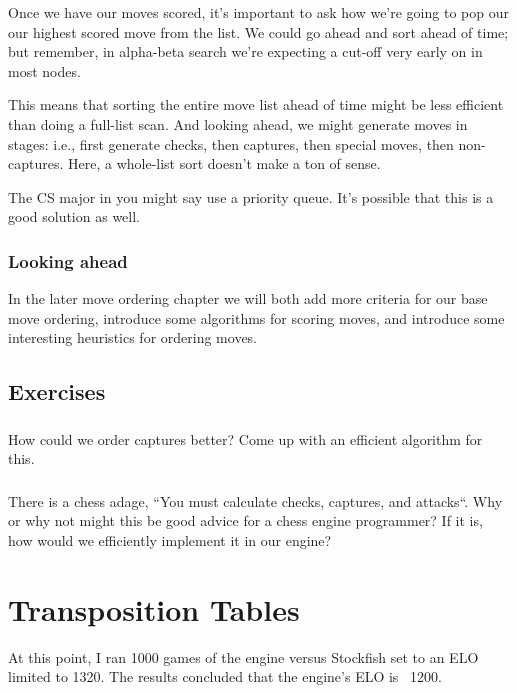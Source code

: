 \documentclass[letterpaper,11pt]{article}
\begin{document}
Once we have our moves scored, it's important to ask how we're going to pop our
our highest scored move from the list. We could go ahead and sort ahead of time;
but remember, in alpha-beta search we're expecting a cut-off very early on in most nodes.

This means that sorting the entire move list ahead of time might be less efficient than 
doing a full-list scan. And looking ahead, we might generate moves in stages: i.e.,
first generate checks, then captures, then special moves, then non-captures. Here, a whole-list 
sort doesn't make a ton of sense.

The CS major in you might say use a priority queue. It's possible that this is a good
solution as well.

\subsubsection*{Looking ahead}

In the later move ordering chapter we will both add more criteria for our base move ordering, 
introduce some algorithms for scoring moves, and introduce some interesting heuristics for 
ordering moves.

\subsection{Exercises}

\subsubsection{}

How could we order captures better? Come up with an efficient algorithm for this.

\subsubsection{}

There is a chess adage, ``You must calculate checks, captures, and attacks``. 
Why or why not might this be good advice for a chess engine programmer? If it is, how would 
we efficiently implement it in our engine?

\section{Transposition Tables}

At this point, I ran 1000 games of the engine versus Stockfish set to an ELO limited to 1320. The results concluded that the engine's ELO is ~1200.
\end{document}
